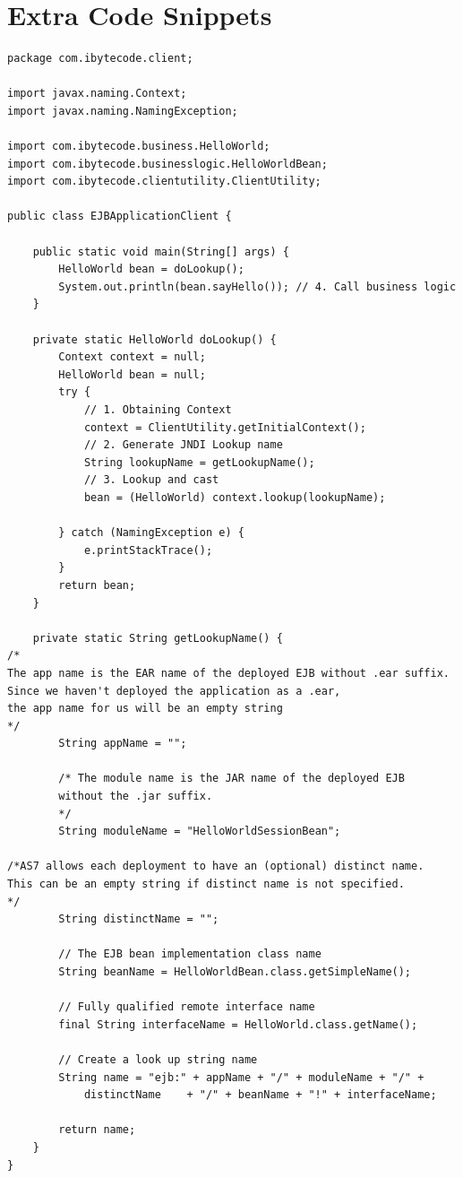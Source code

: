 \documentclass[a4paper,10pt]{scrreprt}
\begin{document}
\chapter{Extra Code Snippets}
\begin{lstlisting}[caption=JNDI Lookup Helper]
 package com.ibytecode.client;
 
import javax.naming.Context;
import javax.naming.NamingException;
 
import com.ibytecode.business.HelloWorld;
import com.ibytecode.businesslogic.HelloWorldBean;
import com.ibytecode.clientutility.ClientUtility;
 
public class EJBApplicationClient {
 
    public static void main(String[] args) {
        HelloWorld bean = doLookup();
        System.out.println(bean.sayHello()); // 4. Call business logic
    }
 
    private static HelloWorld doLookup() {
        Context context = null;
        HelloWorld bean = null;
        try {
            // 1. Obtaining Context
            context = ClientUtility.getInitialContext();
            // 2. Generate JNDI Lookup name
            String lookupName = getLookupName();
            // 3. Lookup and cast
            bean = (HelloWorld) context.lookup(lookupName);
 
        } catch (NamingException e) {
            e.printStackTrace();
        }
        return bean;
    }
 
    private static String getLookupName() {
/*
The app name is the EAR name of the deployed EJB without .ear suffix.
Since we haven't deployed the application as a .ear,
the app name for us will be an empty string
*/
        String appName = "";
 
        /* The module name is the JAR name of the deployed EJB
        without the .jar suffix.
        */
        String moduleName = "HelloWorldSessionBean";
 
/*AS7 allows each deployment to have an (optional) distinct name.
This can be an empty string if distinct name is not specified.
*/
        String distinctName = "";
 
        // The EJB bean implementation class name
        String beanName = HelloWorldBean.class.getSimpleName();
 
        // Fully qualified remote interface name
        final String interfaceName = HelloWorld.class.getName();
 
        // Create a look up string name
        String name = "ejb:" + appName + "/" + moduleName + "/" +
            distinctName    + "/" + beanName + "!" + interfaceName;
 
        return name;
    }
}
\end{lstlisting}
\end{document}
